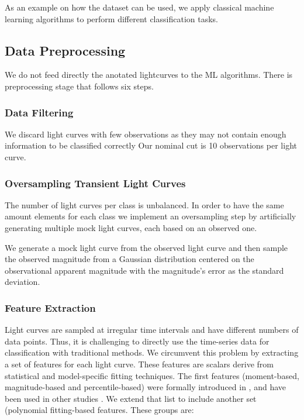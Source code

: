 \documentclass[a4paper,fleqn,usenatbib]{mnras}
\begin{document}
As an example on how the dataset can be used, we apply classical
machine learning algorithms to perform different classification tasks.


\subsection{Data Preprocessing}
We do not feed directly the anotated lightcurves to the ML algorithms.
There is preprocessing stage that follows six steps.

\subsubsection{Data Filtering} \label{subsection_filtering}

We discard light curves with few observations as they may not contain
enough information to be classified correctly
Our nominal cut is 10 observations per light curve.


\subsubsection{Oversampling Transient Light Curves} \label{subsection_oversampling}

The number of light curves per class is unbalanced. 
In order to have the same amount elements for each class we implement an
oversampling step by artificially generating multiple mock light curves,
each based on an observed one. 

We generate a mock light curve from the observed light curve and 
then sample the observed magnitude from a Gaussian distribution
centered on the observational apparent magnitude with the magnitude's
error as the standard deviation. 


\subsubsection{Feature Extraction} \label{subsection_extraction}

Light curves are sampled at irregular time intervals and have
different numbers of data points.
Thus, it is challenging to directly use the time-series data for
classification with traditional methods.
We circumvent this problem by extracting a set of features for each
light curve.
These features are scalars derive from statistical and model-specific
fitting techniques. 
The first features (moment-based, magnitude-based and
percentile-based) were formally introduced in 
\cite{1101.1959}, and have been used in other studies \citep{1603.00882,1601.03931}.  
We extend that list to include another set (polynomial fitting-based features. 
These groups are:
\end{document}
